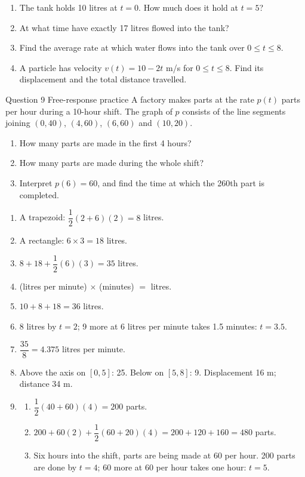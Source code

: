 \documentclass[11pt]{article}
\begin{document}
\begin{enumerate}[leftmargin=*,itemsep=2pt,start=5]
  \item The tank holds 10 litres at $t=0$. How much does it hold at $t=5$?\work{2.1cm}
  \item At what time have exactly 17 litres flowed into the tank?\work{2.1cm}
  \item Find the average rate at which water flows into the tank over $0\le t\le8$.\work{2.1cm}
  \item A particle has velocity $v(t)=10-2t$ m/s for $0\le t\le8$. Find its displacement and the total distance travelled.\work{2.1cm}
\end{enumerate}

\begin{frbox}{Question 9 \textperiodcentered{} Free-response practice}
A factory makes parts at the rate $p(t)$ parts per hour during a 10-hour shift. The graph of $p$ consists of the line segments joining $(0,40)$, $(4,60)$, $(6,60)$ and $(10,20)$.
\begin{enumerate}[label=(\alph*),leftmargin=*,itemsep=2pt]
  \item How many parts are made in the first 4 hours?\work{1.9cm}
  \item How many parts are made during the whole shift?\work{1.9cm}
  \item Interpret $p(6)=60$, and find the time at which the 260th part is completed.\work{1.9cm}
\end{enumerate}
\end{frbox}

\newpage
\begin{solbox}
\begin{enumerate}[leftmargin=*,itemsep=4pt]
  \item A trapezoid: $\dfrac12(2+6)(2)=8$ litres.
  \item A rectangle: $6\times3=18$ litres.
  \item $8+18+\dfrac12(6)(3)=35$ litres.
  \item (litres per minute) $\times$ (minutes) $=$ litres.
  \item $10+8+18=36$ litres.
  \item 8 litres by $t=2$; 9 more at 6 litres per minute takes 1.5 minutes: $t=3.5$.
  \item $\dfrac{35}{8}=4.375$ litres per minute.
  \item Above the axis on $[0,5]$: 25. Below on $[5,8]$: 9. Displacement 16 m; distance 34 m.
  \item \begin{enumerate}[label=(\alph*),leftmargin=*,itemsep=3pt]
    \item $\dfrac12(40+60)(4)=200$ parts.
    \item $200+60(2)+\dfrac12(60+20)(4)=200+120+160=480$ parts.
    \item Six hours into the shift, parts are being made at 60 per hour. 200 parts are done by $t=4$; 60 more at 60 per hour takes one hour: $t=5$.
  \end{enumerate}
\end{enumerate}
\end{solbox}
\end{document}
